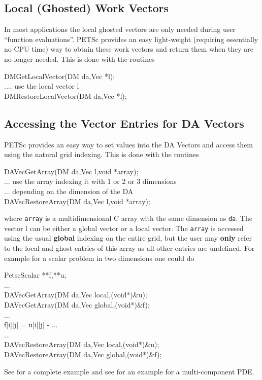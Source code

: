 \subsection{Local (Ghosted) Work Vectors}
In most applications the local ghosted vectors are only needed during user
``function evaluations''. PETSc provides an easy light-weight (requiring 
essentially no CPU time) way to obtain these work vectors and return them when
they are no longer needed. This is done with the routines
\begin{tabbing}
  DMGetLocalVector(DM da,Vec *l);\\
   .... use the local vector l\\
  DMRestoreLocalVector(DM da,Vec *l);
\end{tabbing}

\subsection{Accessing the Vector Entries for DA Vectors}
PETSc provides an easy way to set values into the DA Vectors and access them using
the natural grid indexing. This is done with the routines 
\begin{tabbing}
  DAVecGetArray(DM da,Vec l,void *array);\\
   ... use the array indexing it with 1 or 2 or 3 dimensions \\
   ... depending on the dimension of the DA\\
  DAVecRestoreArray(DM da,Vec l,void *array);
\end{tabbing}
where {\tt array} is a multidimensional C array with the same dimension as
{\tt da}. The vector l can be either a global vector or a local vector.
The {\tt array} is accessed using the usual {\bf global} indexing
on the entire grid, but the user may {\bf only} refer to the local and ghost
entries of this array as all other entries are undefined. For example for a
scalar problem in two dimensions one could do
\begin{tabbing}
   PetscScalar **f,**u;\\
   ...\\
  DAVecGetArray(DM da,Vec local,(void*)\&u);\\
  DAVecGetArray(DM da,Vec global,(void*)\&f);\\
   ...\\
      f[i][j] = u[i][j] - ...\\
   ...\\
  DAVecRestoreArray(DM da,Vec local,(void*)\&u);\\
  DAVecRestoreArray(DM da,Vec global,(void*)\&f);
\end{tabbing}
See  for a 
complete example and see  for an
example for a multi-component PDE.

